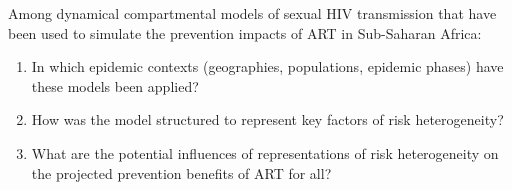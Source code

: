 Among dynamical compartmental models of sexual HIV transmission
that have been used to simulate the prevention impacts of ART in Sub-Saharan Africa:
\begin{enumerate}
\item\label{rq:1}
      In which epidemic contexts (geographies, populations, epidemic phases)
      have these models been applied?
\item\label{rq:2}
      How was the model structured to represent key factors of risk heterogeneity?
\item\label{rq:3}
      What are the potential influences of representations of risk heterogeneity
      on the projected prevention benefits of ART for all?
\end{enumerate}